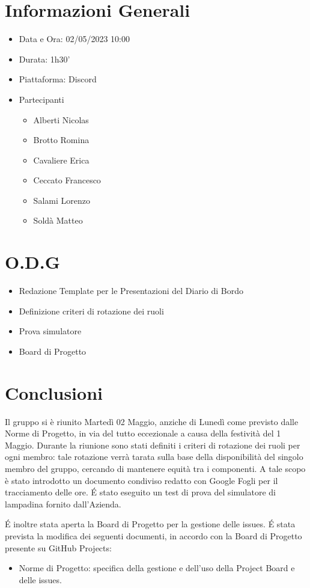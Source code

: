 \documentclass[a4paper, 12pt]{article}
\begin{document}
\makefrontpage

\section*{Informazioni Generali}
\begin{itemize}
    \item Data e Ora: 02/05/2023 10:00
    \item Durata: 1h30'
    \item Piattaforma: Discord
    \item Partecipanti
    \begin{itemize}
        \item Alberti Nicolas
        \item Brotto Romina
        \item Cavaliere Erica
        \item Ceccato Francesco
        \item Salami Lorenzo
        \item Soldà Matteo
    \end{itemize}
\end{itemize}

\section*{O.D.G}
\begin{itemize}
    \item Redazione Template per le Presentazioni del Diario di Bordo
    \item Definizione criteri di rotazione dei ruoli
    \item Prova simulatore
    \item Board di Progetto
\end{itemize}

\section*{Conclusioni}
\indent Il gruppo si è riunito Martedì 02 Maggio, anziche di Lunedì come previsto dalle Norme di Progetto, in via del tutto eccezionale a causa della festività del 1 Maggio.\newline
\indent Durante la riunione sono stati definiti i criteri di rotazione dei ruoli per ogni membro: tale rotazione verrà tarata sulla base della disponibilità del singolo membro del gruppo, cercando di mantenere equità tra i componenti. A tale scopo è stato introdotto un documento condiviso redatto con Google Fogli per il tracciamento delle ore.
\newline
\'E stato eseguito un test di prova del simulatore di lampadina fornito dall'Azienda.

\indent \'E inoltre stata aperta la Board di Progetto per la gestione delle issues. 
\newline
\'E stata prevista la modifica dei seguenti documenti, in accordo con la Board di Progetto presente su GitHub Projects:
\begin{itemize}
    \item Norme di Progetto: specifica della gestione e dell'uso della Project Board e delle issues.
\end{itemize}
\end{document}
